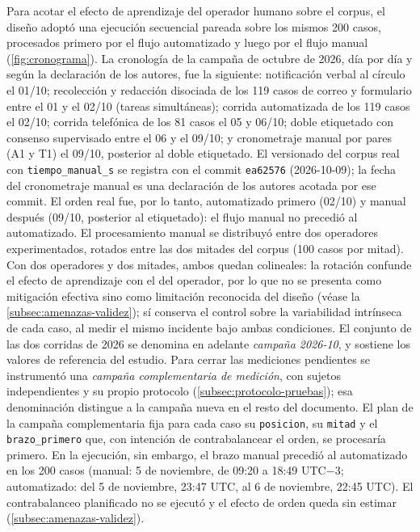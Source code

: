 Para acotar el efecto de aprendizaje del operador humano sobre el corpus, el diseño adoptó una ejecución secuencial pareada sobre los mismos 200 casos, procesados primero por el flujo automatizado y luego por el flujo manual (\autoref{fig:cronograma}). La cronología de la campaña de octubre de 2026, día por día y según la declaración de los autores, fue la siguiente: notificación verbal al círculo el 01/10; recolección y redacción disociada de los 119 casos de correo y formulario entre el 01 y el 02/10 (tareas simultáneas); corrida automatizada de los 119 casos el 02/10; corrida telefónica de los 81 casos el 05 y 06/10; doble etiquetado con consenso supervisado entre el 06 y el 09/10; y cronometraje manual por pares (A1 y T1) el 09/10, posterior al doble etiquetado. El versionado del corpus real con \texttt{tiempo\_manual\_s} se registra con el commit \texttt{ea62576} (2026-10-09); la fecha del cronometraje manual es una declaración de los autores acotada por ese commit. El orden real fue, por lo tanto, automatizado primero (02/10) y manual después (09/10, posterior al etiquetado): el flujo manual no precedió al automatizado. El procesamiento manual se distribuyó entre dos operadores experimentados, rotados entre las dos mitades del corpus (100 casos por mitad). Con dos operadores y dos mitades, ambos quedan colineales: la rotación confunde el efecto de aprendizaje con el del operador, por lo que no se presenta como mitigación efectiva sino como limitación reconocida del diseño (véase la \autoref{subsec:amenazas-validez}); sí conserva el control sobre la variabilidad intrínseca de cada caso, al medir el mismo incidente bajo ambas condiciones. El conjunto de las dos corridas de 2026 se denomina en adelante \emph{campaña 2026-10}, y sostiene los valores de referencia del estudio. Para cerrar las mediciones pendientes se instrumentó una \emph{campaña complementaria de medición}, con sujetos independientes y su propio protocolo (\autoref{subsec:protocolo-pruebas}); esa denominación distingue a la campaña nueva en el resto del documento. El plan de la campaña complementaria fija para cada caso su \texttt{posicion}, su \texttt{mitad} y el \texttt{brazo\_primero} que, con intención de contrabalancear el orden, se procesaría primero. En la ejecución, sin embargo, el brazo manual precedió al automatizado en los 200 casos (manual: 5 de noviembre, de 09:20 a 18:49 UTC\(-3\); automatizado: del 5 de noviembre, 23:47 UTC, al 6 de noviembre, 22:45 UTC). El contrabalanceo planificado no se ejecutó y el efecto de orden queda sin estimar (\autoref{subsec:amenazas-validez}).

